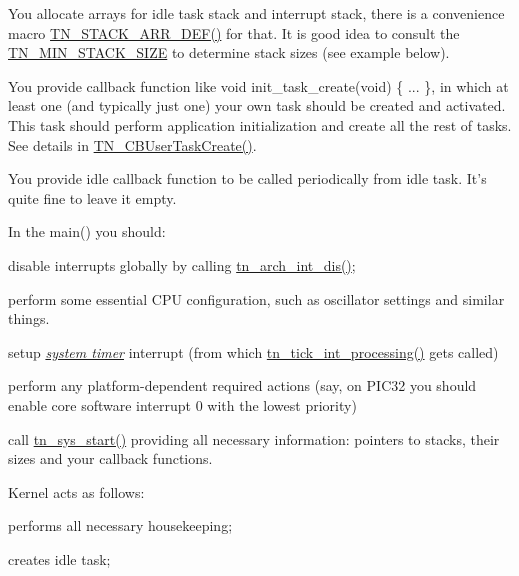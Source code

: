 \begin{DoxyItemize}
\item You allocate arrays for idle task stack and interrupt stack, there is a convenience macro {\ttfamily \hyperlink{tn__sys_8h_ad61af0f0e9ab96bdf1ac1bf1e03e3c75}{T\+N\+\_\+\+S\+T\+A\+C\+K\+\_\+\+A\+R\+R\+\_\+\+D\+E\+F()}} for that. It is good idea to consult the {\ttfamily \hyperlink{tn__arch__example_8h_ad465f81e8ea15a530747b1147dbe4605}{T\+N\+\_\+\+M\+I\+N\+\_\+\+S\+T\+A\+C\+K\+\_\+\+S\+I\+Z\+E}} to determine stack sizes (see example below).
\item You provide callback function like {\ttfamily void init\+\_\+task\+\_\+create(void) \{ ... \}}, in which at least one (and typically just one) your own task should be created and activated. This task should perform application initialization and create all the rest of tasks. See details in {\ttfamily \hyperlink{tn__sys_8h_a94f785ff88dfca8746f34de59784883d}{T\+N\+\_\+\+C\+B\+User\+Task\+Create()}}.
\item You provide idle callback function to be called periodically from idle task. It's quite fine to leave it empty.
\item In the {\ttfamily main()} you should\+:
\begin{DoxyItemize}
\item disable interrupts globally by calling {\ttfamily \hyperlink{tn__arch_8h_a2b3f2294ac42a599662c573394b14c75}{tn\+\_\+arch\+\_\+int\+\_\+dis()}};
\item perform some essential C\+P\+U configuration, such as oscillator settings and similar things.
\item setup {\itshape \hyperlink{quick_guide_time_ticks}{system timer}} interrupt (from which {\ttfamily \hyperlink{tn__sys_8h_a944d96c7a5d442d271115b6cb22a085b}{tn\+\_\+tick\+\_\+int\+\_\+processing()}} gets called)
\item perform any platform-\/dependent required actions (say, on P\+I\+C32 you should enable core software interrupt 0 with the lowest priority)
\item call {\ttfamily \hyperlink{tn__sys_8h_a62ab25d9d8ca01c02d368968f19e49bf}{tn\+\_\+sys\+\_\+start()}} providing all necessary information\+: pointers to stacks, their sizes and your callback functions.
\end{DoxyItemize}
\item Kernel acts as follows\+:
\begin{DoxyItemize}
\item performs all necessary housekeeping;
\item creates idle task;

\end{DoxyItemize}
\end{DoxyItemize}
